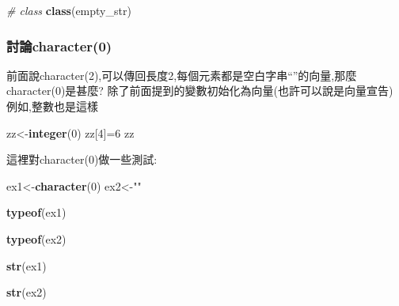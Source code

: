 \documentclass[]{book}
\newenvironment{Shaded}{\begin{snugshade}}{\end{snugshade}}
\newcommand{\KeywordTok}[1]{\textcolor[rgb]{0.13,0.29,0.53}{\textbf{#1}}}
\newcommand{\DecValTok}[1]{\textcolor[rgb]{0.00,0.00,0.81}{#1}}
\newcommand{\StringTok}[1]{\textcolor[rgb]{0.31,0.60,0.02}{#1}}
\newcommand{\CommentTok}[1]{\textcolor[rgb]{0.56,0.35,0.01}{\textit{#1}}}
\newcommand{\NormalTok}[1]{#1}
\theoremstyle{definition}
\theoremstyle{definition}
\theoremstyle{definition}
\theoremstyle{remark}
\begin{document}
\begin{Shaded}
\begin{Highlighting}[]
\CommentTok{# class}
\KeywordTok{class}\NormalTok{(empty_str)}
\end{Highlighting}
\end{Shaded}

\subsubsection{討論character(0)}\label{character0}

前面說character(2),可以傳回長度2,每個元素都是空白字串``''的向量,那麼character(0)是甚麼?
除了前面提到的變數初始化為向量(也許可以說是向量宣告) 例如,整數也是這樣

\begin{Shaded}
\begin{Highlighting}[]
\NormalTok{zz<-}\KeywordTok{integer}\NormalTok{(}\DecValTok{0}\NormalTok{)}
\NormalTok{zz[}\DecValTok{4}\NormalTok{]=}\DecValTok{6}
\NormalTok{zz}
\end{Highlighting}
\end{Shaded}

這裡對character(0)做一些測試:

\begin{Shaded}
\begin{Highlighting}[]
\NormalTok{ex1<-}\KeywordTok{character}\NormalTok{(}\DecValTok{0}\NormalTok{) }
\NormalTok{ex2<-}\StringTok{""}

\KeywordTok{typeof}\NormalTok{(ex1)}
\end{Highlighting}
\end{Shaded}

\begin{Shaded}
\begin{Highlighting}[]
\KeywordTok{typeof}\NormalTok{(ex2)}
\end{Highlighting}
\end{Shaded}

\begin{Shaded}
\begin{Highlighting}[]
\KeywordTok{str}\NormalTok{(ex1)}
\end{Highlighting}
\end{Shaded}

\begin{Shaded}
\begin{Highlighting}[]
\KeywordTok{str}\NormalTok{(ex2)}
\end{Highlighting}
\end{Shaded}
\end{document}
